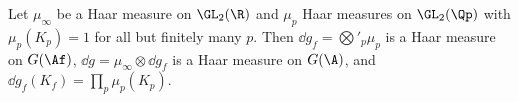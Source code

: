 Let $\mu_\infty$ be a Haar measure on $\GL_2(\R)$ and $\mu_p$ Haar measures on $\GL_2(\Qp)$ with $\mu_p(K_p)=1$ for all but finitely many $p$. Then $\dd g_f=\bigotimes'_p\mu_p$ is a Haar measure on $G(\Af)$, $\dd g=\mu_\infty\otimes\dd g_f$ is a Haar measure on $G(\A)$, and $\dd g_f(K_f)=\prod_p\mu_p(K_p)$.
